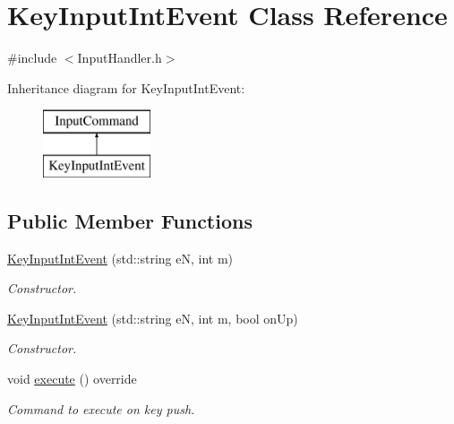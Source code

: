 \hypertarget{class_key_input_int_event}{}\section{Key\+Input\+Int\+Event Class Reference}
\label{class_key_input_int_event}


{\ttfamily \#include $<$Input\+Handler.\+h$>$}

Inheritance diagram for Key\+Input\+Int\+Event\+:\begin{figure}[H]
\begin{center}
\leavevmode
\includegraphics[height=2.000000cm]{class_key_input_int_event}
\end{center}
\end{figure}
\subsection*{Public Member Functions}
\begin{DoxyCompactItemize}
\item 
\mbox{\label{class_key_input_int_event_ab0dc443f0aa8131afc0ef8c27a7e0d05}} 
\mbox{\hyperlink{class_key_input_int_event_ab0dc443f0aa8131afc0ef8c27a7e0d05}{Key\+Input\+Int\+Event}} (std\+::string eN, int m)
\begin{DoxyCompactList}\small\item\em Constructor. \end{DoxyCompactList}\item 
\mbox{\label{class_key_input_int_event_a4985a95069905f4f2b28bbf04f4050af}} 
\mbox{\hyperlink{class_key_input_int_event_a4985a95069905f4f2b28bbf04f4050af}{Key\+Input\+Int\+Event}} (std\+::string eN, int m, bool on\+Up)
\begin{DoxyCompactList}\small\item\em Constructor. \end{DoxyCompactList}\item 
\mbox{\label{class_key_input_int_event_af50e070eb50e9204ef0f1d6d8cfec4ba}} 
void \mbox{\hyperlink{class_key_input_int_event_af50e070eb50e9204ef0f1d6d8cfec4ba}{execute}} () override
\begin{DoxyCompactList}\small\item\em Command to execute on key push. \end{DoxyCompactList}\end{DoxyCompactItemize}
